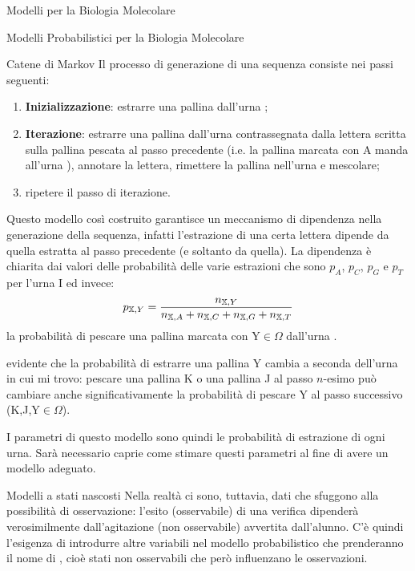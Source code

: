 \documentclass{article}
\begin{document}
\begin{section}{Modelli per la Biologia Molecolare}
\begin{subsection}{Modelli Probabilistici per la Biologia Molecolare}
\begin{subsubsection}{Catene di Markov}
				Il processo di generazione di una sequenza consiste nei passi seguenti:
				\begin{enumerate}[1)]
					\item \textbf{Inizializzazione}: estrarre una pallina dall’urna ;
					\item \textbf{Iterazione}: estrarre una pallina dall’urna contrassegnata dalla lettera scritta sulla pallina pescata al passo precedente (i.e. la pallina marcata con A manda all'urna ), annotare la lettera, rimettere la pallina nell’urna e mescolare;
					\item ripetere il passo di iterazione.
				\end{enumerate}
				Questo modello così costruito garantisce un meccanismo di dipendenza nella generazione della sequenza, infatti l’estrazione di una certa lettera dipende da quella estratta al passo precedente (e soltanto da quella).
				La dipendenza è chiarita dai valori delle probabilità delle varie estrazioni che sono $p_A$, $p_C$, $p_G$ e $p_T$ per l’urna I ed invece: $$ p_{,Y} = \frac{n_{\urna{X},Y}}{n_{\urna{X},A}+n_{\urna{X},C}+n_{\urna{X},G}+n_{\urna{X},T}} $$ la probabilità di pescare una pallina marcata con Y$\in \Omega$ dall’urna \urna{X}.
				
				\Egrave evidente che la probabilità di estrarre una pallina Y cambia a seconda dell'urna in cui mi trovo: pescare una pallina K o una pallina J al passo $n$-esimo può cambiare anche significativamente la probabilità di pescare Y al passo successivo (K,J,Y$\in \Omega$).
				
				I parametri di questo modello sono quindi le probabilità di estrazione di ogni urna. Sarà necessario caprie come stimare questi parametri al fine di avere un modello adeguato.
			\end{subsubsection}
		
			\begin{subsubsection}{Modelli a stati nascosti}
				Nella realtà ci sono, tuttavia, dati che sfuggono alla possibilità di osservazione: l’esito (osservabile) di una verifica dipenderà verosimilmente dall'agitazione (non osservabile) avvertita dall'alunno. 
				C’è quindi l’esigenza di introdurre altre variabili nel modello probabilistico che prenderanno il nome di , cioè stati non osservabili che però influenzano le osservazioni.
				

\end{subsubsection}
\end{subsection}
\end{section}
\end{document}
